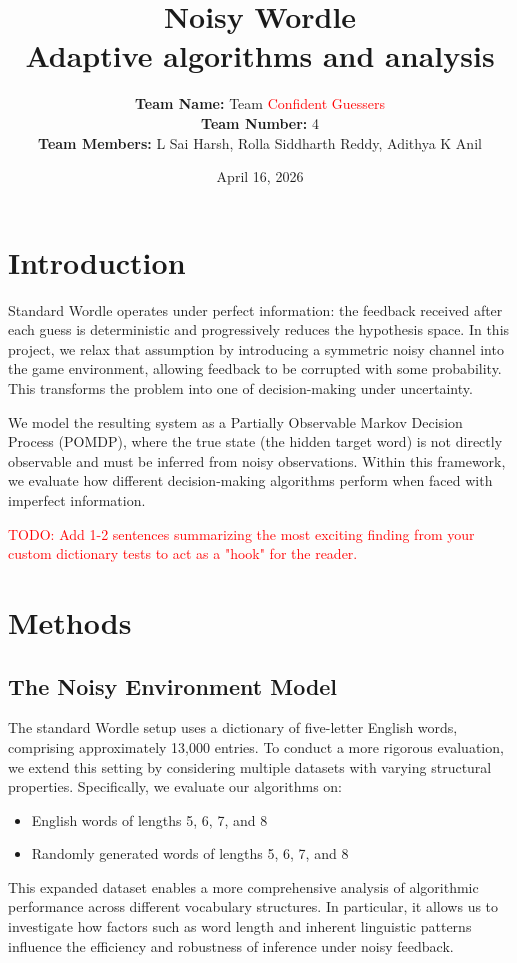 \documentclass[12pt, a4paper]{article}
\title{\textbf{Noisy Wordle}\\ \large Adaptive algorithms and analysis}
\author{
    \textbf{Team Name:} Team \textcolor{red}{Confident Guessers}\\
    \textbf{Team Number:} 4\\
    \textbf{Team Members:} L Sai Harsh, Rolla Siddharth Reddy, Adithya K Anil
}
\date{April 16, 2026} %
\begin{document}
\maketitle

\section{Introduction} 
Standard Wordle operates under perfect information: the feedback received after each guess is deterministic and progressively reduces the hypothesis space. In this project, we relax that assumption by introducing a symmetric noisy channel into the game environment, allowing feedback to be corrupted with some probability. This transforms the problem into one of decision-making under uncertainty.

We model the resulting system as a Partially Observable Markov Decision Process (POMDP), where the true state (the hidden target word) is not directly observable and must be inferred from noisy observations. Within this framework, we evaluate how different decision-making algorithms perform when faced with imperfect information.

\textcolor{red}{TODO: Add 1-2 sentences summarizing the most exciting finding from your custom dictionary tests to act as a "hook" for the reader.}

\section{Methods}

\subsection{The Noisy Environment Model}
The standard Wordle setup uses a dictionary of five-letter English words, comprising approximately 13,000 entries. To conduct a more rigorous evaluation, we extend this setting by considering multiple datasets with varying structural properties. Specifically, we evaluate our algorithms on:

\begin{itemize}
\item English words of lengths 5, 6, 7, and 8
\item Randomly generated words of lengths 5, 6, 7, and 8
\end{itemize}

This expanded dataset enables a more comprehensive analysis of algorithmic performance across different vocabulary structures. In particular, it allows us to investigate how factors such as word length and inherent linguistic patterns influence the efficiency and robustness of inference under noisy feedback.
\end{document}
